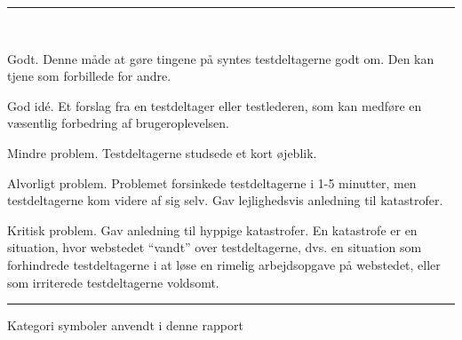 \documentclass[10pt,a4paper]{article}      %
\newcommand\pic[1]{\texttt{[image: Pics/\#1]}}
\renewcommand\good{\pic{good}}
\renewcommand\goodidea{\pic{goodidea}}
\renewcommand\smallproblem{\pic{smallproblem}}
\renewcommand\seriousproblem{\pic{seriousproblem}}
\renewcommand\criticalproblem{\pic{criticalproblem}}
\begin{document}
\begin{table}[!ht]
\centering
\rule{\linewidth}{\heavyrulewidth}\\[6mm]
\begin{kommentarer}

\item[\good] Godt. Denne måde at gøre tingene på syntes testdeltagerne godt om.
Den kan tjene som forbillede for andre.

\item[\goodidea] God idé. Et forslag fra en testdeltager eller testlederen, som
kan medføre en væsentlig forbedring af brugeroplevelsen.

\item[\smallproblem] Mindre problem. Testdeltagerne studsede et kort øjeblik.

\item[\seriousproblem] Alvorligt problem. Problemet forsinkede testdeltagerne i 1-5
minutter, men testdeltagerne kom videre af sig selv. Gav lejlighedsvis
anledning til katastrofer.

\item[\criticalproblem] Kritisk problem. Gav anledning til hyppige katastrofer. En
katastrofe er en situation, hvor webstedet ``vandt'' over testdeltagerne, dvs.
en situation som forhindrede testdeltagerne i at løse en rimelig arbejdsopgave
på webstedet, eller som irriterede testdeltagerne voldsomt.

\end{kommentarer}
\rule{\linewidth}{\heavyrulewidth}
\caption{Kategori symboler anvendt i denne rapport}
\label{tab:gt}
\end{table}%
\clearpage
\end{document}
